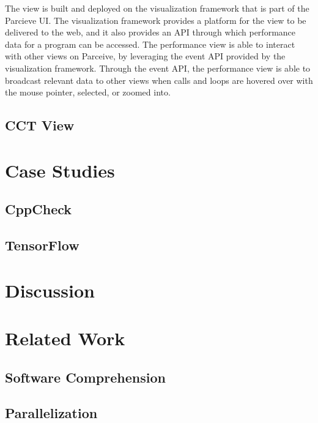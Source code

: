\documentclass[conference]{IEEEtran}
\begin{document}
The view is built and deployed on the visualization framework that is part of the Parcieve UI. The visualization framework provides a platform for the view to be delivered to the web, and it also provides an API through which performance data for a program can be accessed. The performance view is able to interact with other views on Parceive, by leveraging the event API provided by the visualization framework. Through the event API, the performance view is able to broadcast relevant data to other views when calls and loops are hovered over with the mouse pointer, selected, or zoomed into.

\subsection{CCT View}
\label{cct_view}

\section{Case Studies}
\label{sec:case_studies}

\subsection{CppCheck}
\label{sec:cppcheck}

\subsection{TensorFlow}
\label{sec:tensorflow}

\section{Discussion}
\label{sec:discussion}

\section{Related Work}
\label{sec:related_work}

\subsection{Software Comprehension}
\label{sec:software_comprehension}

\subsection{Parallelization}
\label{sec:related_work_parallelization}
\end{document}
